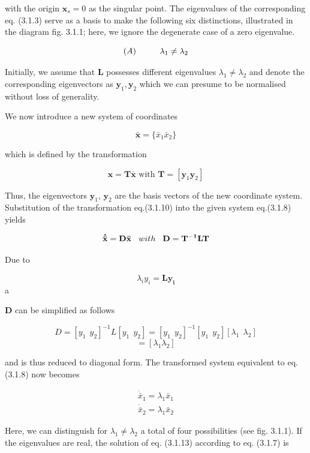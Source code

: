 \documentclass[12pt]{article}
\begin{document}
with the origin $\mathbf{x}_s = 0$ as the singular point. The eigenvalues of the corresponding
eq. (3.1.3) serve as a basis to make the following six distinctions, illustrated in the
diagram fig. 3.1.1; here, we ignore the degenerate case of a zero eigenvalue.

\[
(A) \hspace{10mm}  \lambda_1 \neq \lambda_2
\]

Initially, we assume that \textbf{L} possesses different eigenvalues $\lambda_1 \neq \lambda_2$ and denote the
corresponding eigenvectors as $\mathbf{y}_1, \mathbf{y}_2$ which we can presume to be normalised without
loss of generality.

\hfill

We now introduce a new system of coordinates

\[
\mathbf{\bar{x}} = \{ \bar{x}_1 \bar{x}_2 \} 
\]

which is defined by the transformation

\[
\mathbf{x} = \mathbf{T \bar{x}} \text{ with } \mathbf{T} = [ \mathbf{y}_1 \mathbf{y}_2 ] 
\]

Thus, the eigenvectors $\mathbf{y}_1$, $\mathbf{y}_2$ are the basis vectors of the new coordinate system.
Substitution of the transformation eq.(3.1.10) into the given system eq.(3.1.8)
yields

\[
\mathbf{\dot{\bar{x}}} = \mathbf{D \bar{x}} \hspace{3mm} with \hspace{3mm} \mathbf{D = T^{-1}LT} 
\]

Due to

\[
\lambda_i y_i = \mathbf{L y_i}
\]a

\textbf{D} can be simplified as follows

\[
D = [ y_1 \ \ y_2 ]^{-1} L [y_1 \ \ y_2] = [y_1 \ \ y_2]^{-1} [y_1 \ \ y_2 ] [\lambda_1 \ \ \lambda_2]
\]
\[
= [\lambda_1 \lambda_2] 
\]

and is thus reduced to diagonal form. The transformed system equivalent to
eq. (3.1.8) now becomes

\[
\begin{matrix}
\dot{\bar{x}}_1 = \lambda_1 \bar{x}_1 \\
\dot{\bar{x}}_2 = \lambda_1 \bar{x}_2
\end{matrix}
\]

Here, we can distinguish for $\lambda_1 \neq \lambda_2$ a total of four possibilities (see fig. 3.1.1). If
the eigenvalues are real, the solution of eq. (3.1.13) according to eq. (3.1.7) is
\end{document}
